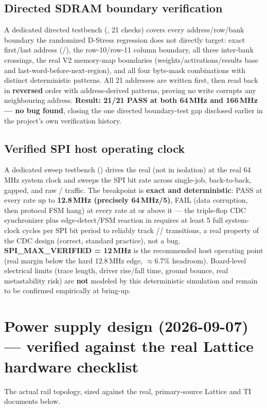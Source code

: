 \subsection{Directed SDRAM boundary verification}
A dedicated directed testbench (, 21 checks)
covers every address/row/bank boundary the randomized D-Stress
regression does not directly target: exact first/last address
(/), the row-10/row-11 column boundary,
all three inter-bank crossings, the real V2 memory-map boundaries
(weights/activations/results base and last-word-before-next-region),
and all four byte-mask combinations with distinct deterministic
patterns. All 21 addresses are written first, then read back in
\textbf{reversed} order with address-derived patterns, proving no
write corrupts any neighbouring address. \textbf{Result: 21/21 PASS at
both 64\,MHz and 166\,MHz --- no bug found}, closing the one directed
boundary-test gap disclosed earlier in the project's own verification
history.

\subsection{Verified SPI host operating clock}
\label{sec:spi-max-verified}
A dedicated sweep testbench () drives the
real  (not  in
isolation) at the real 64\,MHz system clock and sweeps the SPI bit
rate across single-job, back-to-back, gapped, and raw
/ traffic. The breakpoint is
\textbf{exact and deterministic}: PASS at every rate up to
\textbf{12.8\,MHz (precisely 64\,MHz/5)}, FAIL (data corruption, then
protocol FSM hang) at every rate at or above it --- the triple-flop CDC
synchronizer plus edge-detect/FSM reaction in 
requires at least 5 full system-clock cycles per SPI bit period to
reliably track // transitions, a real
property of the CDC design (correct, standard practice), not a bug.
\textbf{SPI\_MAX\_VERIFIED = 12\,MHz} is the recommended host operating
point (real margin below the hard 12.8\,MHz edge, $\approx$6.7\%
headroom). Board-level electrical limits (trace length, driver
rise/fall time, ground bounce, real metastability risk) are
\textbf{not} modeled by this deterministic simulation and remain to be
confirmed empirically at bring-up.

\section{Power supply design (2026-09-07) --- verified against the real
Lattice hardware checklist}
\label{sec:power-addendum}
\begin{fnwarn}
The actual rail topology, sized against the real, primary-source
Lattice and TI documents below.
\end{fnwarn}

